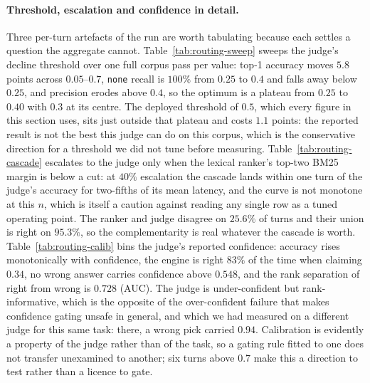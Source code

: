 \paragraph{Threshold, escalation and confidence in detail.} Three per-turn artefacts of the run are worth tabulating because each settles a question the aggregate cannot. Table~\ref{tab:routing-sweep} sweeps the judge's decline threshold over one full corpus pass per value: top-1 accuracy moves $5.8$ points across $0.05$--$0.7$, \texttt{none} recall is $100\%$ from $0.25$ to $0.4$ and falls away below $0.25$, and precision erodes above $0.4$, so the optimum is a plateau from $0.25$ to $0.40$ with $0.3$ at its centre. The deployed threshold of $0.5$, which every figure in this section uses, sits just outside that plateau and costs $1.1$ points: the reported result is not the best this judge can do on this corpus, which is the conservative direction for a threshold we did not tune before measuring. Table~\ref{tab:routing-cascade} escalates to the judge only when the lexical ranker's top-two BM25 margin is below a cut: at $40\%$ escalation the cascade lands within one turn of the judge's accuracy for two-fifths of its mean latency, and the curve is not monotone at this $n$, which is itself a caution against reading any single row as a tuned operating point. The ranker and judge disagree on $25.6\%$ of turns and their union is right on $95.3\%$, so the complementarity is real whatever the cascade is worth. Table~\ref{tab:routing-calib} bins the judge's reported confidence: accuracy rises monotonically with confidence, the engine is right $83\%$ of the time when claiming $0.34$, no wrong answer carries confidence above $0.548$, and the rank separation of right from wrong is $0.728$ (AUC). The judge is under-confident but rank-informative, which is the opposite of the over-confident failure that makes confidence gating unsafe in general, and which we had measured on a different judge for this same task: there, a wrong pick carried $0.94$. Calibration is evidently a property of the judge rather than of the task, so a gating rule fitted to one does not transfer unexamined to another; six turns above $0.7$ make this a direction to test rather than a licence to gate.

